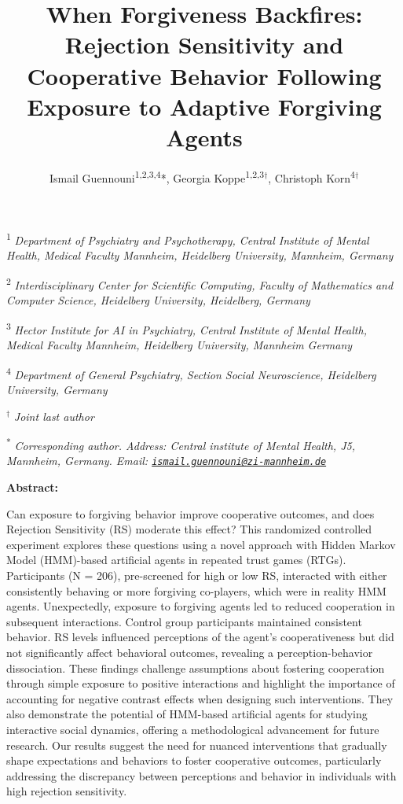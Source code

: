 \documentclass[
]{article}
\title{When Forgiveness Backfires: Rejection Sensitivity and Cooperative Behavior Following Exposure to Adaptive Forgiving Agents}
\author{Ismail Guennouni\textsuperscript{1,2,3,4}*, Georgia Koppe\textsuperscript{1,2,3}\(^\dagger\), Christoph Korn\textsuperscript{4}\(^\dagger\)}
\date{}
\begin{document}
\maketitle

\small

\textsuperscript{1} \emph{Department of Psychiatry and Psychotherapy, Central Institute of
Mental Health, Medical Faculty Mannheim, Heidelberg University,
Mannheim, Germany}

\textsuperscript{2} \emph{Interdisciplinary Center for Scientific Computing, Faculty of
Mathematics and Computer Science, Heidelberg University, Heidelberg,
Germany}

\textsuperscript{3} \emph{Hector Institute for AI in Psychiatry, Central Institute of Mental
Health, Medical Faculty Mannheim, Heidelberg University, Mannheim
Germany}

\textsuperscript{4} \emph{Department of General Psychiatry, Section Social Neuroscience,
Heidelberg University, Germany}

\(^\dagger\) \emph{Joint last author}

\textsuperscript{*} \emph{Corresponding author. Address: Central institute of Mental Health,
J5, Mannheim, Germany. Email:
\href{mailto:ismail.guennouni@zi-mannheim.de}{\nolinkurl{ismail.guennouni@zi-mannheim.de}}}

\pagebreak

\textbf{Abstract:}

Can exposure to forgiving behavior improve cooperative outcomes, and
does Rejection Sensitivity (RS) moderate this effect? This randomized
controlled experiment explores these questions using a novel approach
with Hidden Markov Model (HMM)-based artificial agents in repeated trust
games (RTGs). Participants (N = 206), pre-screened for high or low RS,
interacted with either consistently behaving or more forgiving
co-players, which were in reality HMM agents. Unexpectedly, exposure to
forgiving agents led to reduced cooperation in subsequent interactions.
Control group participants maintained consistent behavior. RS levels
influenced perceptions of the agent's cooperativeness but did not
significantly affect behavioral outcomes, revealing a
perception-behavior dissociation. These findings challenge assumptions
about fostering cooperation through simple exposure to positive
interactions and highlight the importance of accounting for negative
contrast effects when designing such interventions. They also
demonstrate the potential of HMM-based artificial agents for studying
interactive social dynamics, offering a methodological advancement for
future research. Our results suggest the need for nuanced interventions
that gradually shape expectations and behaviors to foster cooperative
outcomes, particularly addressing the discrepancy between perceptions
and behavior in individuals with high rejection sensitivity.
\end{document}
